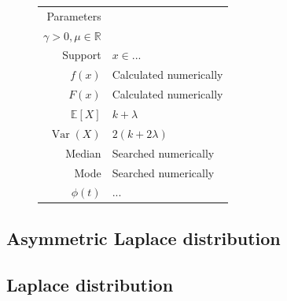 \documentclass[a4paper,11pt]{article}
\theoremstyle{plain}
\theoremstyle{definition}
\newcommand{\ME}{\mathbb{E}}
\newcommand{\MR}{\mathbb{R}}
\newcommand{\Var}{\operatorname{Var}}
\begin{document}
\begin{figure}[!htb]
\begin{minipage}{0.4\textwidth}
\begin{tabular}{| r | l |}
				Parameters & \pbox{\linewidth}{$\alpha \in (0, 2], \beta \in [-1, 1],$\\ $\gamma > 0, \mu \in \MR $} \\
				\hline
				Support & $x \in ...$  \\
				\hline
				$f(x)$ & Calculated numerically \\
				\hline
				$F(x)$ & Calculated numerically \\
				\hline
				$\ME[X]$ & $ k + \lambda$ \\
				\hline
				$\Var(X)$ & $2(k+2\lambda)$ \\
				\hline
				Median & Searched numerically \\
				\hline
				Mode & Searched numerically \\
				\hline
				$\phi(t)$ & $ ...$ \\
				\hline
			\end{tabular}
		\end{minipage}
	\end{figure}
	
	\subsection{Asymmetric Laplace distribution}

	\subsection{Laplace distribution}
	
	\pagebreak
\end{document}
